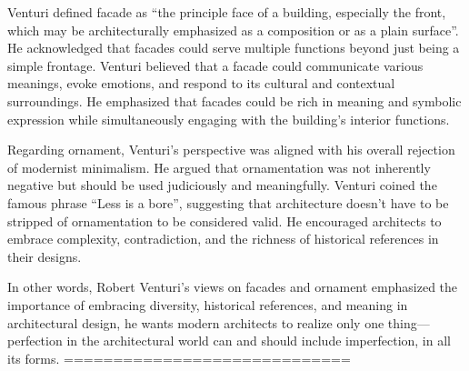 Venturi defined facade as ``the principle face of a building, especially the front, which may be architecturally emphasized as a composition or as a plain surface''.
He acknowledged that facades could serve multiple functions beyond just being a simple frontage.
Venturi believed that a facade could communicate various meanings, evoke emotions, and respond to its cultural and contextual surroundings.
He emphasized that facades could be rich in meaning and symbolic expression while simultaneously engaging with the building's interior functions.

Regarding ornament, Venturi's perspective was aligned with his overall rejection of modernist minimalism.
He argued that ornamentation was not inherently negative but should be used judiciously and meaningfully.
Venturi coined the famous phrase ``Less is a bore'', suggesting that architecture doesn't have to be stripped of ornamentation to be considered valid.
He encouraged architects to embrace complexity, contradiction, and the richness of historical references in their designs.

In other words, Robert Venturi's views on facades and ornament emphasized the importance of embracing diversity, historical references, and meaning in architectural design, he wants modern architects to realize only one thing— perfection in the architectural world can and should include imperfection, in all its forms\cite{Lutolli2020}.
=============================



